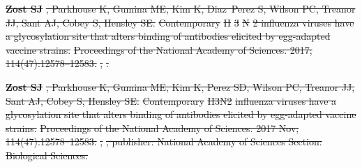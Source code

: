 \documentclass[9pt,lineno]{elife} %
\providecommand{\DIFdel}[1]{{\protect\color{red}\sout{#1}}}                      %
\providecommand{\DIFdeltex}[1]{{\protect\color{red}\sout{#1}}}                      %
\providecommand{\DIFdel}[1]{\texorpdfstring{\DIFdeltex{#1}}{}} %
\begin{document}
\textbf{%
\DIFdel{Zost SJ}}%
\DIFdel{, Parkhouse K, Gumina ME, Kim K,
  Diaz~Perez S, Wilson PC, Treanor JJ, Sant AJ, Cobey S, Hensley SE.
}%
\DIFdel{Contemporary }%
\DIFdel{H}%
\DIFdel{3}%
\DIFdel{N}%
\DIFdel{2 influenza viruses have a glycosylation site
  that alters binding of antibodies elicited by egg-adapted vaccine strains.
}%
\DIFdel{Proceedings of the National Academy of Sciences.  2017;
  114(47):12578--12583.
}%
\DIFdel{,
  }%
\DIFdel{.
}%

\textbf{%
\DIFdel{Zost SJ}}%
\DIFdel{, Parkhouse K, Gumina ME, Kim K, Perez
  SD, Wilson PC, Treanor JJ, Sant AJ, Cobey S, Hensley SE.
}%
\DIFdel{Contemporary }%
\DIFdel{H3N2}%
\DIFdel{influenza viruses have a glycosylation site that
  alters binding of antibodies elicited by egg-adapted vaccine strains.
}%
\DIFdel{Proceedings of the National Academy of Sciences.  2017 Nov;
  114(47):12578--12583.
}%
\DIFdel{,
  }%
\DIFdel{, publisher: National Academy of
  Sciences Section: Biological Sciences.
}%


\end{document}
